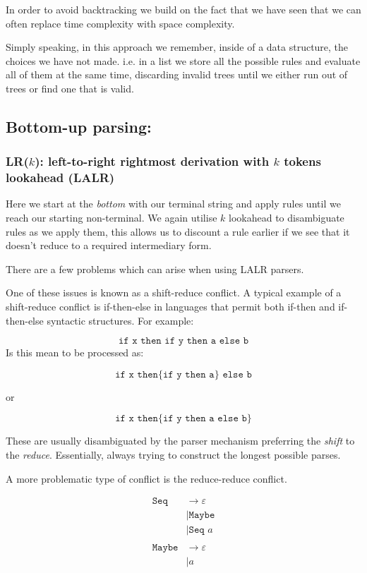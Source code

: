 \documentclass{article}
\renewcommand{\i}[1]{\textit{#1}}
\newcommand{\rarr}{\rightarrow}
\begin{document}
In order to avoid backtracking we build on the fact that we have seen that we can often replace time complexity with space complexity.

Simply speaking, in this approach we remember, inside of a data structure, the choices we have not made. i.e. in a list we store all the possible rules and evaluate all of them at the same time, discarding invalid trees until we either run out of trees or find one that is valid.
\subsection{Bottom-up parsing:}
\subsubsection{LR($k$): left-to-right rightmost derivation with $k$ tokens lookahead (LALR)}

Here we start at the \i{bottom} with our terminal string and apply rules until we reach our starting non-terminal. We again utilise $k$ lookahead to disambiguate rules as we apply them, this allows us to discount a rule earlier if we see that it doesn't reduce to a required intermediary form.

There are a few problems which can arise when using LALR parsers. 

One of these issues is known as a shift-reduce conflict. A typical example of a shift-reduce conflict is if-then-else in languages that permit both if-then and if-then-else syntactic structures. For example:

$$
\texttt{if x then if y then a else b}
$$
Is this mean to be processed as:

$$
\texttt{if x then} \{ \texttt{if y then a}\}\texttt{ else b}
$$

or 

$$
\texttt{if x then} \{\texttt{if y then a else b}\}
$$

These are usually disambiguated by the parser mechanism preferring the \i{shift} to the \i{reduce}. Essentially, always trying to construct the longest possible parses.

A more problematic type of conflict is the reduce-reduce conflict.

\begin{align*}
    \texttt{Seq} &\rarr \varepsilon \\
        &| \texttt{Maybe} \\
        &| \texttt{Seq }a \\
        \\
    \texttt{Maybe} &\rarr \varepsilon \\
          &| a
\end{align*}
\end{document}
